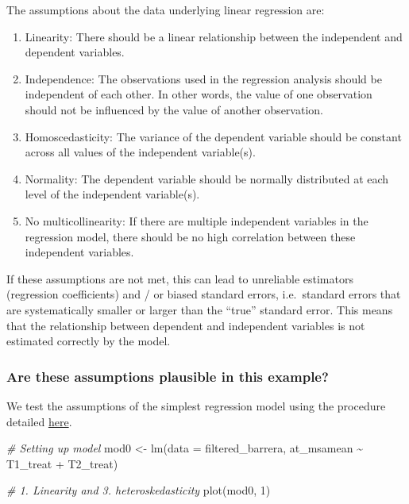 \documentclass[
]{article}
\newenvironment{Shaded}{\begin{snugshade}}{\end{snugshade}}
\newcommand{\AttributeTok}[1]{\textcolor[rgb]{0.77,0.63,0.00}{#1}}
\newcommand{\CommentTok}[1]{\textcolor[rgb]{0.56,0.35,0.01}{\textit{#1}}}
\newcommand{\DecValTok}[1]{\textcolor[rgb]{0.00,0.00,0.81}{#1}}
\newcommand{\FunctionTok}[1]{\textcolor[rgb]{0.00,0.00,0.00}{#1}}
\newcommand{\NormalTok}[1]{#1}
\newcommand{\OtherTok}[1]{\textcolor[rgb]{0.56,0.35,0.01}{#1}}
\newcommand{\SpecialCharTok}[1]{\textcolor[rgb]{0.00,0.00,0.00}{#1}}
\begin{document}
The assumptions about the data underlying linear regression are:

\begin{enumerate}
\def\labelenumi{\arabic{enumi}.}
\item
  Linearity: There should be a linear relationship between the
  independent and dependent variables.
\item
  Independence: The observations used in the regression analysis should
  be independent of each other. In other words, the value of one
  observation should not be influenced by the value of another
  observation.
\item
  Homoscedasticity: The variance of the dependent variable should be
  constant across all values of the independent variable(s).
\item
  Normality: The dependent variable should be normally distributed at
  each level of the independent variable(s).
\item
  No multicollinearity: If there are multiple independent variables in
  the regression model, there should be no high correlation between
  these independent variables.
\end{enumerate}

If these assumptions are not met, this can lead to unreliable estimators
(regression coefficients) and / or biased standard errors, i.e.~standard
errors that are systematically smaller or larger than the ``true''
standard error. This means that the relationship between dependent and
independent variables is not estimated correctly by the model.

\hypertarget{are-these-assumptions-plausible-in-this-example}{%
\subsubsection{Are these assumptions plausible in this
example?}\label{are-these-assumptions-plausible-in-this-example}}

We test the assumptions of the simplest regression model using the
procedure detailed
\href{https://godatadrive.com/blog/basic-guide-to-test-assumptions-of-linear-regression-in-r}{here}.

\begin{Shaded}
\begin{Highlighting}[]
\CommentTok{\# Setting up model}
\NormalTok{mod0 }\OtherTok{\textless{}{-}} \FunctionTok{lm}\NormalTok{(}\AttributeTok{data =}\NormalTok{ filtered\_barrera, at\_msamean }\SpecialCharTok{\textasciitilde{}}\NormalTok{ T1\_treat }\SpecialCharTok{+}\NormalTok{ T2\_treat)}

\CommentTok{\# 1. Linearity and 3. heteroskedasticity}
\FunctionTok{plot}\NormalTok{(mod0, }\DecValTok{1}\NormalTok{)}
\end{Highlighting}
\end{Shaded}
\end{document}
